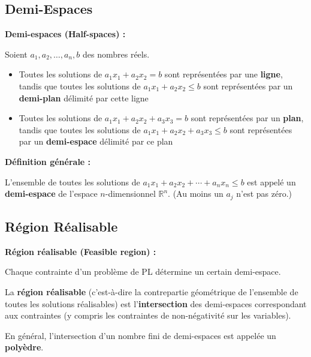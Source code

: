 \documentclass[12pt,a4paper]{article}
\begin{document}
\newpage
\subsection{Demi-Espaces}

\begin{definition}
\textbf{Demi-espaces (Half-spaces) :}

Soient $a_1, a_2, \ldots, a_n, b$ des nombres réels.

\begin{itemize}
    \item Toutes les solutions de $a_1x_1 + a_2x_2 = b$ sont représentées par une \textcolor{titrebleu}{\textbf{ligne}}, tandis que toutes les solutions de $a_1x_1 + a_2x_2 \leq b$ sont représentées par un \textcolor{titrebleu}{\textbf{demi-plan}} délimité par cette ligne
    
    \item Toutes les solutions de $a_1x_1 + a_2x_2 + a_3x_3 = b$ sont représentées par un \textcolor{defvert}{\textbf{plan}}, tandis que toutes les solutions de $a_1x_1 + a_2x_2 + a_3x_3 \leq b$ sont représentées par un \textcolor{defvert}{\textbf{demi-espace}} délimité par ce plan
\end{itemize}

\textbf{Définition générale :}

L'ensemble de toutes les solutions de $a_1x_1 + a_2x_2 + \cdots + a_nx_n \leq b$ est appelé un \textcolor{importantrouge}{\textbf{demi-espace}} de l'espace $n$-dimensionnel $\mathbb{R}^n$. (Au moins un $a_j$ n'est pas zéro.)
\end{definition}

\subsection{Région Réalisable}

\begin{definition}
\textbf{Région réalisable (Feasible region) :}

Chaque contrainte d'un problème de PL détermine un certain demi-espace.

La \textcolor{defvert}{\textbf{région réalisable}} (c'est-à-dire la contrepartie géométrique de l'ensemble de toutes les solutions réalisables) est l'\textcolor{importantrouge}{\textbf{intersection}} des demi-espaces correspondant aux contraintes (y compris les contraintes de non-négativité sur les variables).

En général, l'intersection d'un nombre fini de demi-espaces est appelée un \textcolor{algoviolet}{\textbf{polyèdre}}.
\end{definition}
\end{document}
